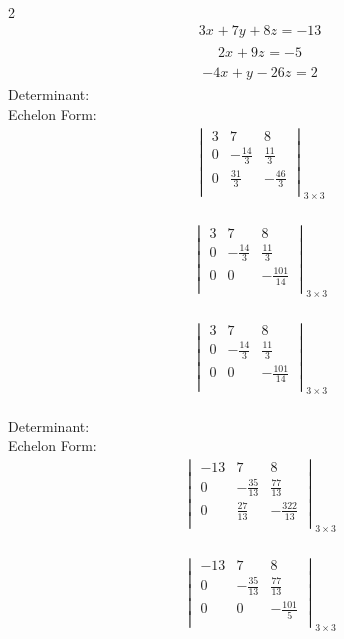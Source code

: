 \documentclass{article}
\begin{document}
\\
2\begin{align*}
3x_{} + 7y_{} + 8z_{} = -13\end{align*}
\begin{align*}
2x_{} + 9z_{} = -5\end{align*}
\begin{align*}
-4x_{} + y_{} - 26z_{} = 2\end{align*}
Determinant:\\
Echelon Form:\\
\begin{align*}
\begin{vmatrix}
3 & 7 & 8\\
0 & -\frac{14}{3} & \frac{11}{3}\\
0 & \frac{31}{3} & -\frac{46}{3}\\
\end{vmatrix}_{3\times 3}
\end{align*}
\\
\begin{align*}
\begin{vmatrix}
3 & 7 & 8\\
0 & -\frac{14}{3} & \frac{11}{3}\\
0 & 0 & -\frac{101}{14}\\
\end{vmatrix}_{3\times 3}
\end{align*}
\\
\begin{align*}
\begin{vmatrix}
3 & 7 & 8\\
0 & -\frac{14}{3} & \frac{11}{3}\\
0 & 0 & -\frac{101}{14}\\
\end{vmatrix}_{3\times 3}
\end{align*}
\\
Determinant:\\
Echelon Form:\\
\begin{align*}
\begin{vmatrix}
-13 & 7 & 8\\
0 & -\frac{35}{13} & \frac{77}{13}\\
0 & \frac{27}{13} & -\frac{322}{13}\\
\end{vmatrix}_{3\times 3}
\end{align*}
\\
\begin{align*}
\begin{vmatrix}
-13 & 7 & 8\\
0 & -\frac{35}{13} & \frac{77}{13}\\
0 & 0 & -\frac{101}{5}\\
\end{vmatrix}_{3\times 3}
\end{align*}
\end{document}
